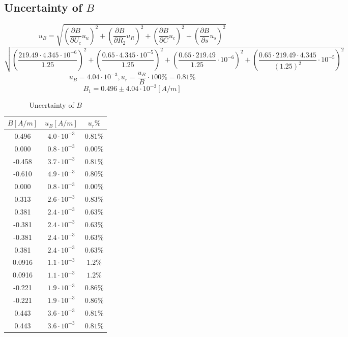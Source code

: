 \documentclass[12pt]{article}
\begin{document}
\subsection{Uncertainty of $B$}
$$u_B=\sqrt{(\frac{\partial B}{\partial U_c}u_u)^2+(\frac{\partial B}{\partial R_2}u_R)^2+(\frac{\partial B}{\partial C}u_c)^2+(\frac{\partial B}{\partial s}u_s)^2}$$
$$\sqrt{(\frac{219.49\cdot4.345\cdot10^{-6}}{1.25})^2+(\frac{0.65\cdot4.345\cdot10^{-5}}{1.25})^2+(\frac{0.65\cdot219.49}{1.25}\cdot10^{-6})^2+(\frac{0.65\cdot219.49\cdot4.345}{(1.25)^2}\cdot10^{-5})^2}$$
$$u_B=4.04\cdot10^{-3},u_r=\frac{u_B}{B}\cdot100\%=0.81\%$$
$$B_1=0.496\pm4.04\cdot10^{-3}[A/m]$$
\begin{table}[H]
\centering
\begin{tabular}{|c|c|c|}
\hline
$B[A/m]$ & $u_B[A/m]$ &$u_r\%$  \\ \hline
0.496 &$4.0\cdot10^{-3}$  &$0.81\%$  \\ \hline
0.000 &$0.8\cdot10^{-3}$  &$0.00\%$  \\ \hline
-0.458 &$3.7\cdot10^{-3}$  &$0.81\%$    \\ \hline
-0.610 &$4.9\cdot10^{-3}$  &$0.80\%$    \\ \hline
0.000 &$0.8\cdot10^{-3}$  &$0.00\%$  \\ \hline
0.313 &$2.6\cdot10^{-3}$  &$0.83\%$    \\ \hline
0.381&$2.4\cdot10^{-3}$  &$0.63\%$    \\ \hline
-0.381&$2.4\cdot10^{-3}$  &$0.63\%$    \\ \hline
-0.381&$2.4\cdot10^{-3}$  &$0.63\%$    \\ \hline
0.381&$2.4\cdot10^{-3}$  &$0.63\%$    \\ \hline
0.0916&$1.1\cdot10^{-3}$  &$1.2\%$    \\ \hline
0.0916&$1.1\cdot10^{-3}$  &$1.2\%$    \\ \hline
-0.221&$1.9\cdot10^{-3}$  &$0.86\%$    \\ \hline
-0.221&$1.9\cdot10^{-3}$  &$0.86\%$    \\ \hline
0.443 &$3.6\cdot10^{-3}$  &$0.81\%$    \\ \hline
0.443 &$3.6\cdot10^{-3}$  &$0.81\%$    \\ \hline
\end{tabular}
\caption{Uncertainty of $B$}
\end{table}
\end{document}
